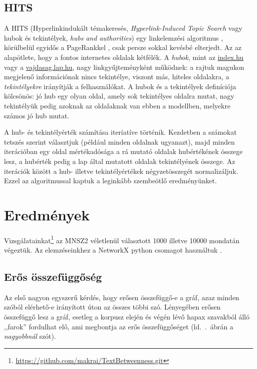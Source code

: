 \documentclass{llncs}
\begin{document}
\subsection{HITS}

A HITS (Hyperlinkindukált témakeresés, \emph{Hyperlink-Induced Topic Search}
vagy hubok és tekintélyek, \emph{hubs and authorities}) egy linkelemzési
algoritmus \cite{Kleinberg:1999},
körülbelül egyidős a PageRankkel \cite{page1999pagerank}, csak persze sokkal
kevésbé elterjedt.
Az az alapötlete, hogy a fontos internetes oldalak kétfélék.  A \emph{hubok},
mint az \href{https://index.hu/}{index.hu} vagy a
\href{https://vajdasag.lap.hu/}{vajdasag.lap.hu}, nagy linkgyűjteményként
működnek: a rajtuk magukon megjelenő információnak nincs tekintélye, viszont
más, hiteles oldalakra, a \emph{tekintélyekre} irányítják a felhasználókat. A
hubok és a tekintélyek definíciója kölcsönös: jó hub egy olyan oldal, amely sok
tekintélyes oldalra mutat, nagy tekintélyük pedig azoknak az oldalaknak van
ebben a modellben, melyekre számos jó hub mutat.

A hub- és tekintélyérték számítása iteríatíve történik.  Kezdetben a számokat
tetszés szerint választjuk (például minden oldalnak ugyanazt), majd minden
iterációban egy oldal mértékadósága a rá mutató oldalak hubértékének összege
lesz, a hubérték pedig a lap által mutatott oldalak tekintélyének összege.  Az
iterációk között a hub- illetve tekintélyértékek négyzetösszegét normalizáljuk.
Ezzel az algoritmussal kaptuk a leginkább szembeötlő eredményünket.

\section{Eredmények}
\label{sec:results}

Vizsgálatainkat\footnote{\url{https://github.com/makrai/TextBetweenness.git}}
az MNSZ2 \cite{oravecz2014hungarian} véletlenül választott 1000 illetve 10000
mondatán végeztük.
%
Az elemzéseinkhez a NetworkX python csomagot használtuk
\cite{hagberg2008exploring}.



\subsection{Erős összefüggőség}
Az első nagyon egyszerű kérdés, hogy erősen összefüggő-e a gráf,
azaz minden szóból elérhető-e irányított úton az összes többi szó.
Lényegében erősen összefüggő lesz a gráf,
esetleg a korpusz elején és végén lévő
hapax szavakból álló ,,farok'' fordulhat elő,
ami megbontja az erős összefüggőséget
(ld.\ .\ ábrán a \emph{nagyobbnál} szót).
\end{document}
